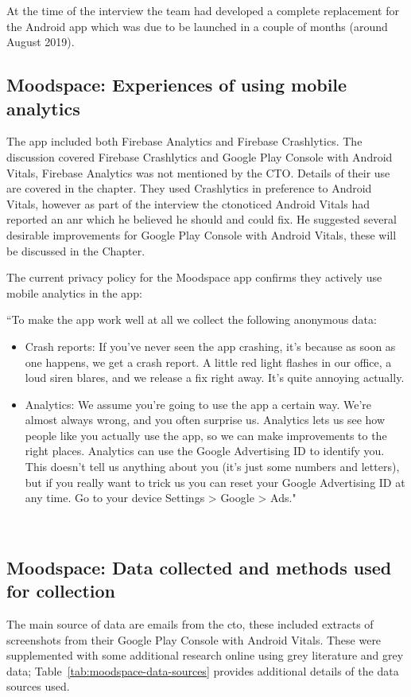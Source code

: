 At the time of the interview the team had developed a complete replacement for the Android app which was due to be launched in a couple of months (around August 2019).

\subsection{Moodspace: Experiences of using mobile analytics}
The app included both Firebase Analytics and Firebase Crashlytics. The discussion covered Firebase Crashlytics and Google Play Console with Android Vitals, Firebase Analytics was not mentioned by the CTO. Details of their use are covered in the  chapter. They used Crashlytics in preference to Android Vitals, however as part of the interview the \acrshort{cto}noticed Android Vitals had reported an \acrshort{anr} which he believed he should and could fix. He suggested several desirable improvements for Google Play Console with Android Vitals, these will be discussed in the  Chapter.

The current privacy policy for the Moodspace app confirms they actively use mobile analytics in the app: 

{\small
``To make the app work well at all we collect the following anonymous data:
    \begin{itemize}
        \itemsep0em
        \item Crash reports: If you've never seen the app crashing, it's because as soon as one happens, we get a crash report. A little red light flashes in our office, a loud siren blares, and we release a fix right away. It's quite annoying actually.
        \item Analytics: We assume you're going to use the app a certain way. We're almost always wrong, and you often surprise us. Analytics lets us see how people like you actually use the app, so we can make improvements to the right places. Analytics can use the Google Advertising ID to identify you. This doesn't tell us anything about you (it's just some numbers and letters), but if you really want to trick us you can reset your Google Advertising ID at any time. Go to your device Settings > Google > Ads."
    \end{itemize}~
}

\subsection{Moodspace: Data collected and methods used for collection}
The main source of data are emails from the \acrshort{cto}, these included extracts of screenshots from their Google Play Console with Android Vitals. These were supplemented with some additional research online using grey literature and grey data; Table~\ref{tab:moodspace-data-sources} provides additional details of the data sources used.

